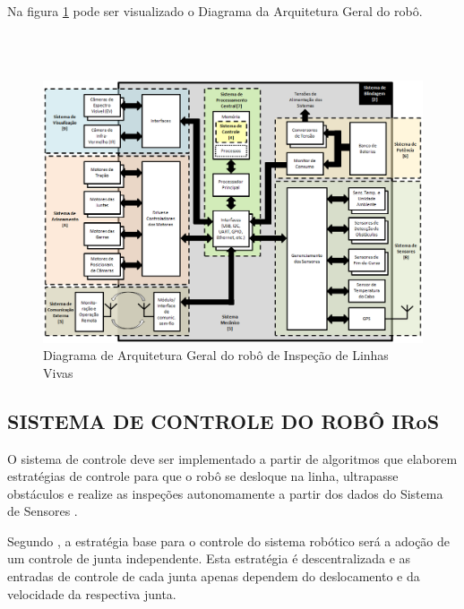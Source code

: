 \documentclass[12pt,oneside,a4paper, chapter=TITLE, section = TITLE, english, brazil]{abntex2}
\begin{document}
Na figura \ref{fig:diagrama} pode ser visualizado o Diagrama da Arquitetura Geral do robô.

\ \\ \ \\

\begin{figure}[h] %
\centering
\includegraphics[scale=0.45]{./imagens/Diagrama_Completo}
\caption[Diagrama de Arquitetura Geral do robô de Inspeção de Linhas Vivas]{Diagrama de Arquitetura Geral do robô de Inspeção de Linhas Vivas \cite{cemig}}
\label{fig:diagrama}
\end{figure}

\subsection{SISTEMA DE CONTROLE DO ROBÔ IRoS} %

O sistema de controle deve ser implementado a partir de algoritmos que elaborem estratégias de controle para que o robô se desloque na linha, ultrapasse obstáculos e realize as inspeções autonomamente a partir dos dados do Sistema de Sensores \cite{cemig}.

Segundo , a estratégia base para o controle do sistema robótico será a adoção de um controle de junta independente. Esta estratégia é descentralizada e as entradas de controle de cada junta apenas dependem do deslocamento e da velocidade da respectiva junta.
\end{document}
